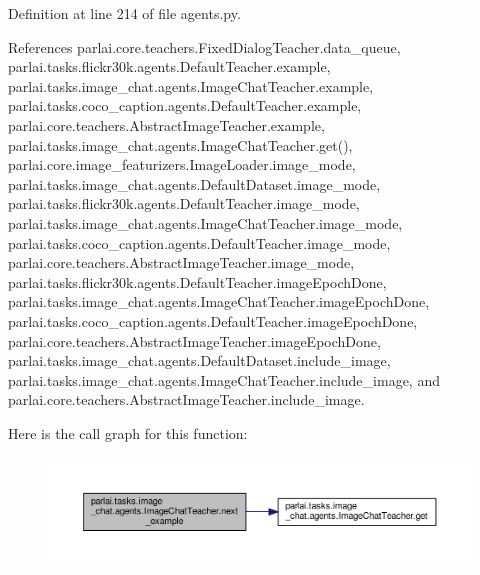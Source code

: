 Definition at line 214 of file agents.\+py.



References parlai.\+core.\+teachers.\+Fixed\+Dialog\+Teacher.\+data\+\_\+queue, parlai.\+tasks.\+flickr30k.\+agents.\+Default\+Teacher.\+example, parlai.\+tasks.\+image\+\_\+chat.\+agents.\+Image\+Chat\+Teacher.\+example, parlai.\+tasks.\+coco\+\_\+caption.\+agents.\+Default\+Teacher.\+example, parlai.\+core.\+teachers.\+Abstract\+Image\+Teacher.\+example, parlai.\+tasks.\+image\+\_\+chat.\+agents.\+Image\+Chat\+Teacher.\+get(), parlai.\+core.\+image\+\_\+featurizers.\+Image\+Loader.\+image\+\_\+mode, parlai.\+tasks.\+image\+\_\+chat.\+agents.\+Default\+Dataset.\+image\+\_\+mode, parlai.\+tasks.\+flickr30k.\+agents.\+Default\+Teacher.\+image\+\_\+mode, parlai.\+tasks.\+image\+\_\+chat.\+agents.\+Image\+Chat\+Teacher.\+image\+\_\+mode, parlai.\+tasks.\+coco\+\_\+caption.\+agents.\+Default\+Teacher.\+image\+\_\+mode, parlai.\+core.\+teachers.\+Abstract\+Image\+Teacher.\+image\+\_\+mode, parlai.\+tasks.\+flickr30k.\+agents.\+Default\+Teacher.\+image\+Epoch\+Done, parlai.\+tasks.\+image\+\_\+chat.\+agents.\+Image\+Chat\+Teacher.\+image\+Epoch\+Done, parlai.\+tasks.\+coco\+\_\+caption.\+agents.\+Default\+Teacher.\+image\+Epoch\+Done, parlai.\+core.\+teachers.\+Abstract\+Image\+Teacher.\+image\+Epoch\+Done, parlai.\+tasks.\+image\+\_\+chat.\+agents.\+Default\+Dataset.\+include\+\_\+image, parlai.\+tasks.\+image\+\_\+chat.\+agents.\+Image\+Chat\+Teacher.\+include\+\_\+image, and parlai.\+core.\+teachers.\+Abstract\+Image\+Teacher.\+include\+\_\+image.

Here is the call graph for this function\+:
\nopagebreak
\begin{figure}[H]
\begin{center}
\leavevmode
\includegraphics[width=350pt]{classparlai_1_1tasks_1_1image__chat_1_1agents_1_1ImageChatTeacher_a2b795770610618bf94e76705cb90611a_cgraph}
\end{center}
\end{figure}
\mbox{\label{classparlai_1_1tasks_1_1image__chat_1_1agents_1_1ImageChatTeacher_ae37398f75ec883f5bbf276bf7b2cf715}} 
